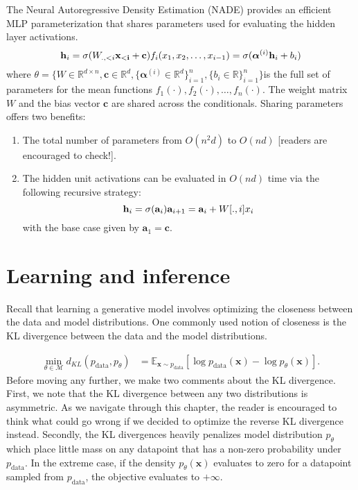 The Neural Autoregressive Density Estimation (NADE) provides an efficient MLP parameterization that shares parameters used for evaluating the hidden layer activations.
\[
\mathbf{h}_i = \sigma(W_{., <i} \mathbf{x_{<i}} + \mathbf{c})\\
f_i(x_1, x_2, \ldots, x_{i-1}) =\sigma(\boldsymbol{\alpha}^{(i)}\mathbf{h}_i +b_i )  
\]
where $\theta=\{W\in \mathbb{R}^{d\times n}, \mathbf{c} \in \mathbb{R}^d, \{\boldsymbol{\alpha}^{(i)}\in \mathbb{R}^d\}^n_{i=1}, \{b_i \in \mathbb{R}\}^n_{i=1}\}$is the full set of parameters for the mean functions $f_1(\cdot), f_2(\cdot), \ldots, f_n(\cdot)$. The weight matrix $W$ and the bias vector $\mathbf{c}$ are shared across the conditionals. Sharing parameters offers two benefits:
\begin{enumerate}
\item The total number of parameters from $O(n^2 d)$ to $O(nd)$ [readers are encouraged to check!].
\item The hidden unit activations can be evaluated in $O(nd)$ time via the following recursive strategy:
\[
\mathbf{h}_i = \sigma(\mathbf{a}_i)\\
\mathbf{a}_{i+1} = \mathbf{a}_{i} + W[., i]x_i
\]
with the base case given by $\mathbf{a}_1=\mathbf{c}$.
\end{enumerate}


\section{Learning and inference}

Recall that learning a generative model involves optimizing the closeness between the data and model distributions. One commonly used notion of closeness is the KL divergence between the data and the model distributions.

$$
\begin{align*}
\min_{\theta\in \mathcal{M}}d_{KL}(p_{\mathrm{data}}, p_{\theta}) &= \mathbb{E}_{\mathbf{x} \sim p_{\mathrm{data}} }\left[\log p_{\mathrm{data}}(\mathbf{x}) - \log p_{\theta}(\mathbf{x})\right].
\end{align*}
$$
Before moving any further, we make two comments about the KL divergence. First, we note that the KL divergence between any two distributions is asymmetric. As we navigate through this chapter, the reader is encouraged to think what could go wrong if we decided to optimize the reverse KL divergence instead. Secondly, the KL divergences heavily penalizes model distribution $p_\theta$ which place little mass on any datapoint that has a non-zero probability under $p_{\mathrm{data}}$. In the extreme case, if the density $p_\theta(\mathbf{x})$ evaluates to zero for a datapoint sampled from $p_{\mathrm{data}}$, the objective evaluates to $+\infty$. 

